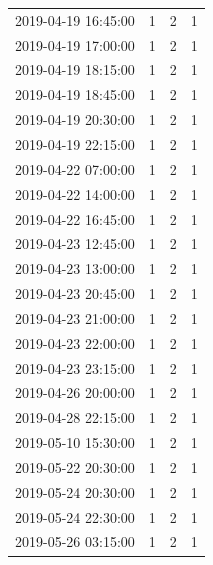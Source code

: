 \begin{tabular}{lrrr}
2019-04-19 16:45:00 & 1 & 2 & 1 \\
2019-04-19 17:00:00 & 1 & 2 & 1 \\
2019-04-19 18:15:00 & 1 & 2 & 1 \\
2019-04-19 18:45:00 & 1 & 2 & 1 \\
2019-04-19 20:30:00 & 1 & 2 & 1 \\
2019-04-19 22:15:00 & 1 & 2 & 1 \\
2019-04-22 07:00:00 & 1 & 2 & 1 \\
2019-04-22 14:00:00 & 1 & 2 & 1 \\
2019-04-22 16:45:00 & 1 & 2 & 1 \\
2019-04-23 12:45:00 & 1 & 2 & 1 \\
2019-04-23 13:00:00 & 1 & 2 & 1 \\
2019-04-23 20:45:00 & 1 & 2 & 1 \\
2019-04-23 21:00:00 & 1 & 2 & 1 \\
2019-04-23 22:00:00 & 1 & 2 & 1 \\
2019-04-23 23:15:00 & 1 & 2 & 1 \\
2019-04-26 20:00:00 & 1 & 2 & 1 \\
2019-04-28 22:15:00 & 1 & 2 & 1 \\
2019-05-10 15:30:00 & 1 & 2 & 1 \\
2019-05-22 20:30:00 & 1 & 2 & 1 \\
2019-05-24 20:30:00 & 1 & 2 & 1 \\
2019-05-24 22:30:00 & 1 & 2 & 1 \\
2019-05-26 03:15:00 & 1 & 2 & 1 \\
\bottomrule
\end{tabular}
